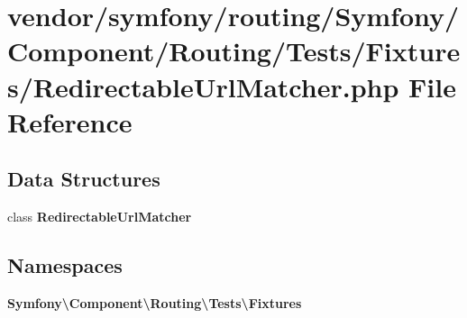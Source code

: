 \section{vendor/symfony/routing/\+Symfony/\+Component/\+Routing/\+Tests/\+Fixtures/\+Redirectable\+Url\+Matcher.php File Reference}
\label{_tests_2_fixtures_2_redirectable_url_matcher_8php}
\subsection*{Data Structures}
\begin{DoxyCompactItemize}
\item 
class {\bf Redirectable\+Url\+Matcher}
\end{DoxyCompactItemize}
\subsection*{Namespaces}
\begin{DoxyCompactItemize}
\item 
 {\bf Symfony\textbackslash{}\+Component\textbackslash{}\+Routing\textbackslash{}\+Tests\textbackslash{}\+Fixtures}
\end{DoxyCompactItemize}
